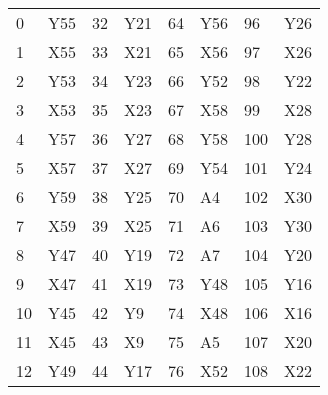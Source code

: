 \begin{table}[!htbp]
\begin{tabular}{p{}p{}p{}p{}p{}p{}p{}p{}}
  \cellcolor[HTML]{AA0044}0	  & Y55 & \cellcolor[HTML]{AA0044}32  & Y21 & \cellcolor[HTML]{AA0044}64  & Y56 & \cellcolor[HTML]{AA0044}96  & Y26 \\
  1   & X55 & 33  & X21 & 65  & X56 & 97  & X26 \\
  \cellcolor[HTML]{AA0044}2   & Y53 & \cellcolor[HTML]{AA0044}34  & Y23 & \cellcolor[HTML]{AA0044}66  & Y52 & \cellcolor[HTML]{AA0044}98  & Y22 \\
  3   & X53 & 35  & X23 & 67  & X58 & 99  & X28 \\
  \cellcolor[HTML]{AA0044}4   & Y57 & \cellcolor[HTML]{AA0044}36  & Y27 & \cellcolor[HTML]{AA0044}68  & Y58 & \cellcolor[HTML]{AA0044}100 & Y28 \\
  5   & X57 & 37  & X27 & \cellcolor[HTML]{AA0044}69  & Y54 & \cellcolor[HTML]{AA0044}101 & Y24 \\
  \cellcolor[HTML]{AA0044}6   & Y59 & \cellcolor[HTML]{AA0044}38  & Y25 & 70  & A4  & 102 & X30 \\
  7   & X59 & 39  & X25 & \cellcolor[HTML]{AA0044}71  & A6  & \cellcolor[HTML]{AA0044}103 & Y30 \\
  \cellcolor[HTML]{AA0044}8   & Y47 & \cellcolor[HTML]{AA0044}40  & Y19 & \cellcolor[HTML]{AA0044}72  & A7  & \cellcolor[HTML]{AA0044}104 & Y20 \\
  9   & X47 & 41  & X19 & \cellcolor[HTML]{AA0044}73  & Y48 & \cellcolor[HTML]{AA0044}105 & Y16 \\
  \cellcolor[HTML]{AA0044}10  & Y45 & \cellcolor[HTML]{AA0044}42  & Y9  & 74  & X48 & 106 & X16 \\
  11  & X45 & 43  & X9  & 75  & A5  & 107 & X20 \\
  \cellcolor[HTML]{AA0044}12  & Y49 & \cellcolor[HTML]{AA0044}44  & Y17 & 76  & X52 & 108 & X22 \\

\end{tabular}
\end{table}
